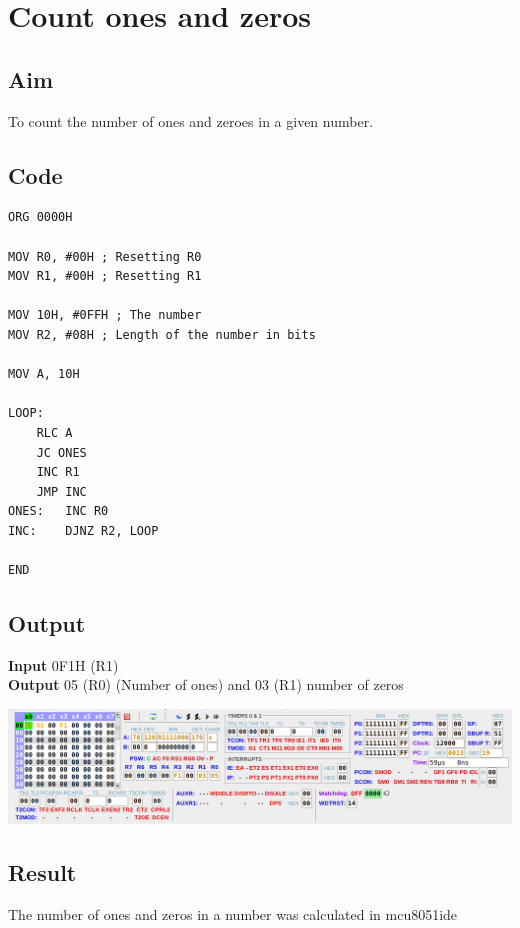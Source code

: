 \section{Count ones and zeros}
\subsection{Aim}
To count the number of ones and zeroes in a given number.

\subsection{Code}
\begin{lstlisting}
ORG 0000H

MOV R0, #00H ; Resetting R0
MOV R1, #00H ; Resetting R1

MOV 10H, #0FFH ; The number
MOV R2, #08H ; Length of the number in bits

MOV A, 10H

LOOP:
	RLC A
	JC ONES
	INC R1
	JMP INC
ONES:	INC R0
INC:	DJNZ R2, LOOP

END
\end{lstlisting}

\subsection{Output}
\textbf{Input} 0F1H (R1)\\
\textbf{Output} 05 (R0) (Number of ones) and 03 (R1) number of zeros\\
\begin{center}
	\includegraphics[width=\textwidth]{img/p25.png}
\end{center}

\subsection{Result}
The number of ones and zeros in a number was calculated in mcu8051ide